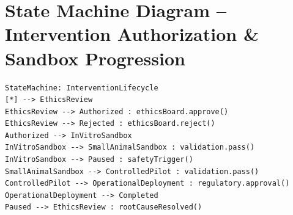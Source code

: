 \documentclass[11pt,a4paper]{report}
\begin{document}
\section{State Machine Diagram -- Intervention Authorization \& Sandbox Progression}

\begin{lstlisting}[style=sysmlstyle]
StateMachine: InterventionLifecycle
[*] --> EthicsReview
EthicsReview --> Authorized : ethicsBoard.approve()
EthicsReview --> Rejected : ethicsBoard.reject()
Authorized --> InVitroSandbox
InVitroSandbox --> SmallAnimalSandbox : validation.pass()
InVitroSandbox --> Paused : safetyTrigger()
SmallAnimalSandbox --> ControlledPilot : validation.pass()
ControlledPilot --> OperationalDeployment : regulatory.approval()
OperationalDeployment --> Completed
Paused --> EthicsReview : rootCauseResolved()
\end{lstlisting}
\end{document}
